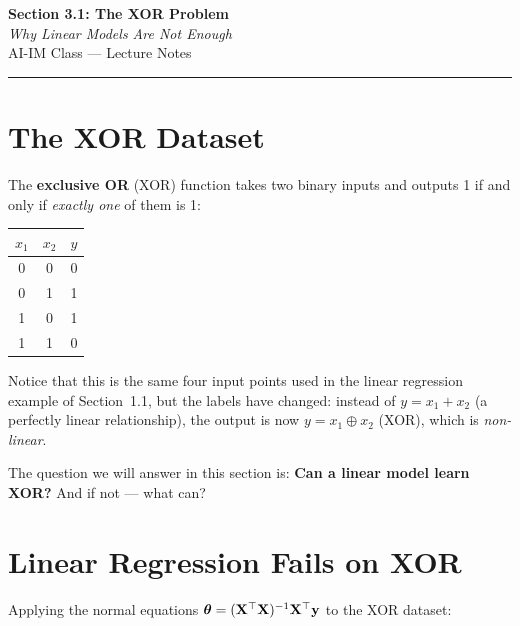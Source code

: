 \documentclass[12pt, a4paper]{article}
\begin{document}
\begin{center}
  {\LARGE \textbf{Section 3.1: The XOR Problem}} \\[0.3em]
  {\large\itshape Why Linear Models Are Not Enough} \\[0.5em]
  {\large AI-IM Class — Lecture Notes}%
  \ifstudentmode
  \fi
\end{center}

\vspace{1em}
\hrule
\vspace{1.5em}

\section{The XOR Dataset}

The \textbf{exclusive OR} (XOR) function takes two binary inputs and outputs 1
if and only if \emph{exactly one} of them is 1:

\begin{center}
  \renewcommand{\arraystretch}{1.2}
  \begin{tabular}{ccc}
    \toprule
    $x_1$ & $x_2$ & $y$ \\
    \midrule
    0     & 0     & 0   \\
    0     & 1     & 1   \\
    1     & 0     & 1   \\
    1     & 1     & 0   \\
    \bottomrule
  \end{tabular}
\end{center}

Notice that this is the same four input points used in the linear regression
example of Section~1.1, but the labels have changed: instead of $y = x_1 + x_2$
(a perfectly linear relationship), the output is now $y = x_1 \oplus x_2$
(XOR), which is \emph{non-linear}.

The question we will answer in this section is:
\textbf{Can a linear model learn XOR?} And if not — what can?

\section{Linear Regression Fails on XOR}

Applying the normal equations $\boldsymbol{\theta} = (\mathbf{X}^{\top}\mathbf{X})^{-1}\mathbf{X}^{\top}\mathbf{y}$ to
the XOR dataset:
\end{document}
